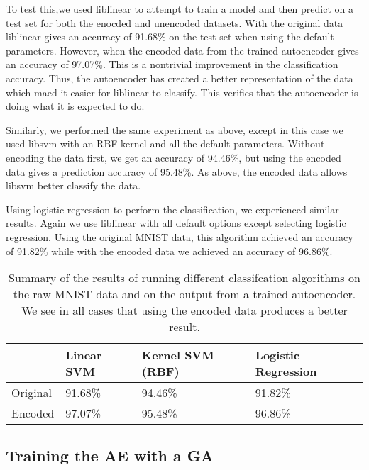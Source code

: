 To test this,we used liblinear to attempt to train a model and then predict on
a test set for both the enocded and unencoded datasets. With the original data
liblinear gives an accuracy of 91.68\% on the test set when using the default
parameters. However, when the encoded data from the trained autoencoder gives
an accuracy of 97.07\%. This is a nontrivial improvement in the classification
accuracy. Thus, the autoencoder has created a better representation of the data
which maed it easier for liblinear to classify. This verifies that the
autoencoder is doing what it is expected to do.

Similarly, we performed the same experiment as above, except in this case we
used libsvm with an RBF kernel and all the default parameters.  Without
encoding the data first, we get an accuracy of 94.46\%, but using the encoded
data gives a prediction accuracy of 95.48\%. As above, the encoded data allows libsvm
better classify the data.

Using logistic regression to perform the classification, we experienced similar results.
Again we use liblinear with all default options except selecting logistic regression. Using the
original MNIST data, this algorithm achieved an accuracy of 91.82\% while with the encoded data
we achieved an accuracy of 96.86\%.

\begin{table}[h]
	\begin{tabular}{l|lll}
		& Linear SVM & Kernel SVM (RBF) & Logistic Regression \\ \hline
		Original & 91.68\%    & 94.46\%          & 91.82\%             \\
		Encoded  & 97.07\%    & 95.48\%          & 96.86\%            
	\end{tabular}
	\label{tab:classvsenc}
	\caption{Summary of the results of running different classifcation algorithms on the raw MNIST data and on the output from a trained autoencoder. We
	see in all cases that using the encoded data produces a better result.}
\end{table}

\subsection{Training the AE with a GA}




